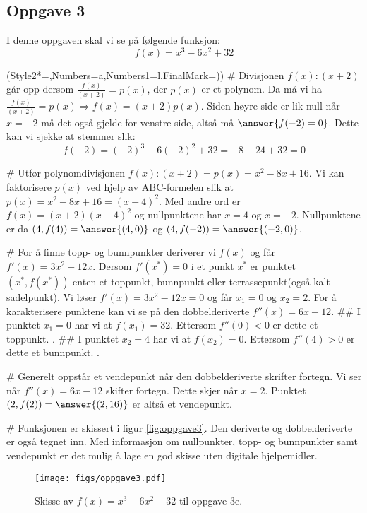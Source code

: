 \subsection*{Oppgave 3}
I denne oppgaven skal vi se på følgende funksjon:
\begin{equation*}
f(x) = x^3 - 6x^2 + 32
\end{equation*}
\begin{easylist}[enumerate]
	\ListProperties(Style2*=,Numbers=a,Numbers1=l,FinalMark={)})
	# Divisjonen $f(x) : (x+2)$ går opp dersom $\frac{f(x)}{(x+2)} = p(x)$, der $p(x)$ er et polynom. Da må vi ha $\frac{f(x)}{(x+2)} = p(x) \Rightarrow f(x) = (x+2) p(x)$. Siden høyre side er lik null når $x = -2$ må det også gjelde for venstre side, altså må $\answer{f(-2) = 0}$. Dette kan vi sjekke at stemmer slik:
	\begin{equation*}
	f(-2) = (-2)^3 - 6(-2)^2 + 32 = -8 -24 +32 = 0
	\end{equation*}
	
	# Utfør polynomdivisjonen $f(x):(x+2) = p(x) = x^2 - 8x + 16$. Vi kan faktorisere $p(x)$ ved hjelp av ABC-formelen slik at $p(x) = x^2 - 8x + 16 =  (x-4)^2$. Med andre ord er $f(x) = (x+2)(x-4)^2$ og nullpunktene har $x = 4$ og $x = -2$. Nullpunktene er da $(4, f(4)) = \answer{(4, 0)}$ og  $(4, f(-2)) = \answer{(-2, 0)}$.
	
	# For å finne topp- og bunnpunkter deriverer vi $f(x)$ og får $f'(x) = 3x^2 - 12x$.
	Dersom $f'(x^*) = 0$ i et punkt $x^*$ er punktet $\left(x^*, f\left(x^*\right)\right)$ enten et toppunkt, bunnpunkt eller terrassepunkt(også kalt sadelpunkt). 
	Vi løser $f'(x) = 3x^2 - 12x = 0$ og får $x_1 = 0$ og $x_2 = 2$. For å karakterisere punktene kan vi se på den dobbelderiverte $f''(x) = 6x - 12$.
	## I punktet $x_1 = 0$ har vi at $f(x_1) = 32$. Ettersom $f''(0) < 0$ er dette et toppunkt. .
	## I punktet $x_2 = 4$ har vi at $f(x_2) = 0$. Ettersom $f''(4) > 0$ er dette et bunnpunkt. .
	
	# Generelt oppstår et vendepunkt når den dobbelderiverte skrifter fortegn. 
	Vi ser når $f''(x) = 6x - 12$ skifter fortegn. Dette skjer når $x = 2$. Punktet $\left(2, f(2)\right) = \answer{\left(2, 16\right)}$ er altså et vendepunkt.
	
	# Funksjonen er skissert i figur \eqref{fig:oppgave3}. 
	Den deriverte og dobbelderiverte er også tegnet inn.
	Med informasjon om nullpunkter, topp- og bunnpunkter samt vendepunkt er det mulig å lage en god skisse uten digitale hjelpemidler.
	
	\begin{figure}[th!]
		\centering
		\texttt{[image: figs/oppgave3.pdf]}
		\caption{Skisse av $f(x) = x^3 - 6x^2 + 32$ til oppgave 3e.}
		\label{fig:oppgave3}
	\end{figure}
\end{easylist}


